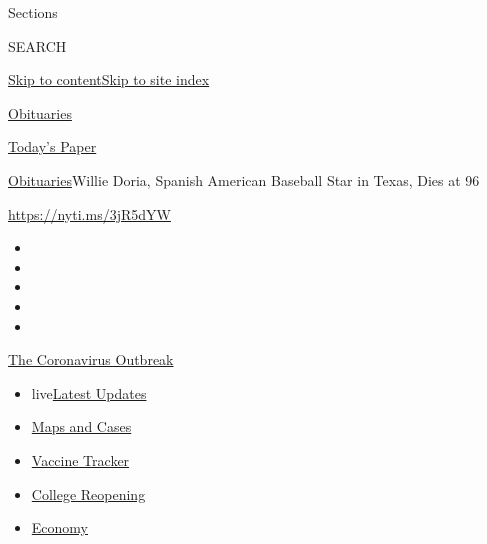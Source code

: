 Sections

SEARCH

\protect\hyperlink{site-content}{Skip to
content}\protect\hyperlink{site-index}{Skip to site index}

\href{https://www.nytimes3xbfgragh.onion/section/obituaries}{Obituaries}

\href{https://myaccount.nytimes3xbfgragh.onion/auth/login?response_type=cookie\&client_id=vi}{}

\href{https://www.nytimes3xbfgragh.onion/section/todayspaper}{Today's
Paper}

\href{/section/obituaries}{Obituaries}\textbar{}Willie Doria, Spanish
American Baseball Star in Texas, Dies at 96

\url{https://nyti.ms/3jR5dYW}

\begin{itemize}
\item
\item
\item
\item
\item
\end{itemize}

\href{https://www.nytimes3xbfgragh.onion/news-event/coronavirus?action=click\&pgtype=Article\&state=default\&region=TOP_BANNER\&context=storylines_menu}{The
Coronavirus Outbreak}

\begin{itemize}
\tightlist
\item
  live\href{https://www.nytimes3xbfgragh.onion/2020/08/04/world/coronavirus-covid-19.html?action=click\&pgtype=Article\&state=default\&region=TOP_BANNER\&context=storylines_menu}{Latest
  Updates}
\item
  \href{https://www.nytimes3xbfgragh.onion/interactive/2020/us/coronavirus-us-cases.html?action=click\&pgtype=Article\&state=default\&region=TOP_BANNER\&context=storylines_menu}{Maps
  and Cases}
\item
  \href{https://www.nytimes3xbfgragh.onion/interactive/2020/science/coronavirus-vaccine-tracker.html?action=click\&pgtype=Article\&state=default\&region=TOP_BANNER\&context=storylines_menu}{Vaccine
  Tracker}
\item
  \href{https://www.nytimes3xbfgragh.onion/2020/08/02/us/covid-college-reopening.html?action=click\&pgtype=Article\&state=default\&region=TOP_BANNER\&context=storylines_menu}{College
  Reopening}
\item
  \href{https://www.nytimes3xbfgragh.onion/live/2020/08/03/business/stock-market-today-coronavirus?action=click\&pgtype=Article\&state=default\&region=TOP_BANNER\&context=storylines_menu}{Economy}
\end{itemize}

